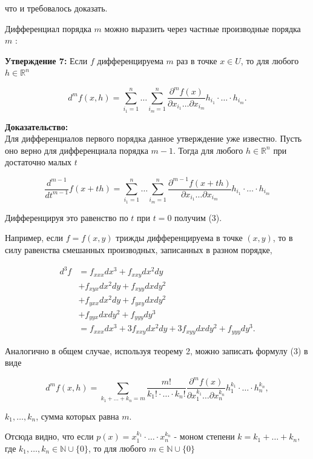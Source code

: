 \documentclass[a4paper,12pt]{article} %
\begin{document}
что и требовалось доказать.

Дифференциал порядка $m$ можно выразить через частные производные порядка $m$ :

\textbf{Утверждение 7:} Если $f$ дифференцируема $m$ раз в точке $x \in U$, то для любого $h \in \mathbb{R}^{n}$

$$
d^{m} f(x, h)=\sum_{i_{1}=1}^{n} \ldots \sum_{i_{m}=1}^{n} \frac{\partial^{m} f(x)}{\partial x_{i_{1}} \ldots \partial x_{i_{m}}} h_{i_{1}} \cdot \ldots \cdot h_{i_{m}} .
$$

\textbf{Доказательство:}\\
Для дифференциалов первого порядка данное утверждение уже известно. Пусть оно верно для дифференциала порядка $m-1$. Тогда для любого $h \in \mathbb{R}^{n}$ при достаточно малых $t$

$$
\frac{d^{m-1}}{d t^{m-1}} f(x+t h)=\sum_{i_{1}=1}^{n} \ldots \sum_{i_{m}=1}^{n} \frac{\partial^{m-1} f(x+t h)}{\partial x_{i_{1}} \ldots \partial x_{i_{m}}} h_{i_{1}} \cdot \ldots \cdot h_{i_{m}}
$$

Дифференцируя это равенство по $t$ при $t=0$ получим (3).

Например, если $f=f(x, y)$ трижды дифференцируема в точке $(x, y)$, то в силу равенства смешанных производных, записанных в разном порядке,

$$
\begin{aligned}
d^{3} f & =f_{x x x} d x^{3}+f_{x x y} d x^{2} d y \\
& +f_{x y x} d x^{2} d y+f_{x y y} d x d y^{2} \\
& +f_{y x x} d x^{2} d y+f_{y x y} d x d y^{2} \\
& +f_{y y x} d x d y^{2}+f_{y y y} d y^{3} \\
& =f_{x x x} d x^{3}+3 f_{x x y} d x^{2} d y+3 f_{x y y} d x d y^{2}+f_{y y y} d y^{3} .
\end{aligned}
$$

Аналогично в общем случае, используя теорему 2, можно записать формулу (3) в виде

$$
d^{m} f(x, h)=\sum_{k_{1}+\ldots+k_{n}=m} \frac{m !}{k_{1} ! \cdot \ldots \cdot k_{n} !} \frac{\partial^{m} f(x)}{\partial x_{1}^{k_{1}} \ldots \partial x_{n}^{k_{n}}} h_{1}^{k_{1}} \cdot \ldots \cdot h_{n}^{k_{n}},
$$

$k_{1}, \ldots, k_{n}$, сумма которых равна $m$.

Отсюда видно, что если $p(x)=x_{1}^{k_{1}} \cdot \ldots \cdot x_{n}^{k_{n}}$ - моном степени $k=k_{1}+\ldots+k_{n}$, где $k_{1}, \ldots, k_{n} \in \mathbb{N} \cup\{0\}$, то для любого $m \in \mathbb{N} \cup\{0\}$
\end{document}
